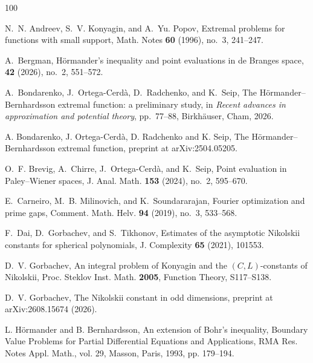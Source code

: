 \documentclass[a4paper,reqno,12pt]{amsart}
\begin{document}
\begin{thebibliography}{100}

N.~N. Andreev, S.~V. Konyagin, and A.~Yu. Popov,
{Extremal problems for functions with small support},
Math. Notes \textbf{60} (1996), no.~3, 241--247.

A.~Bergman,
\newblock H{\"o}rmander's inequality and point evaluations in de {Branges} space,
 \textbf{42} (2026), no.~2, 551--572.

A.~Bondarenko, J.~Ortega-Cerd\`a, D.~Radchenko, and K.~Seip,
{The H\"ormander--Bernhardsson extremal function: a preliminary study},
in \emph{Recent advances in approximation and potential theory},
pp.~77--88,
Birkh\"auser, Cham, 2026.

A. Bondarenko, J. Ortega-Cerd\`a, D. Radchenko and K. Seip,
The Hörmander--Bernhardsson extremal function, preprint at arXiv:2504.05205.

O.~F. Brevig, A.~Chirre, J.~Ortega-Cerd\`a, and K.~Seip,
{Point evaluation in Paley--Wiener spaces},
J. Anal. Math. \textbf{153} (2024), no.~2, 595--670.

E.~Carneiro, M.~B. Milinovich, and K.~Soundararajan,
{Fourier optimization and prime gaps},
Comment. Math. Helv. \textbf{94} (2019), no.~3, 533--568.

F.~Dai, D.~Gorbachev, and S.~Tikhonov,
Estimates of the asymptotic Nikolskii constants for spherical polynomials,
J. Complexity \textbf{65} (2021), 101553.

D.~V. Gorbachev,
An integral problem of Konyagin and the $(C,L)$-constants of Nikolskii, Proc. Steklov Inst. Math. {\bf 2005}, Function Theory, S117--S138.

D.~V. Gorbachev,
The Nikolskii constant in odd dimensions, preprint at arXiv:2608.15674 (2026).



L. H\"ormander and B. Bernhardsson, An extension of Bohr’s inequality, Boundary Value Problems
for Partial Differential Equations and Applications, RMA Res. Notes Appl. Math., vol. 29, Masson,
Paris, 1993, pp. 179–194.


\end{thebibliography}
\end{document}
